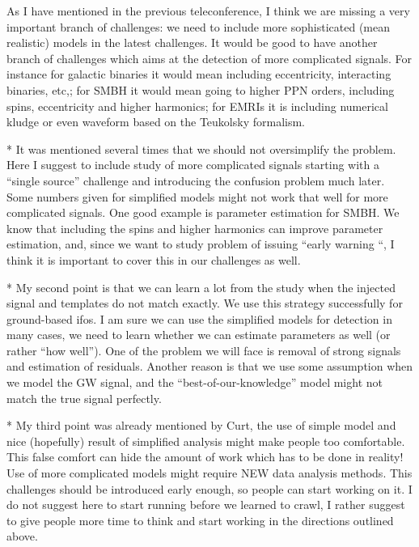 \documentclass[11pt]{report}
\begin{document}
As I have mentioned in the previous teleconference, I think we are missing a very important branch of challenges: we need to include more sophisticated (mean realistic) models in the latest challenges. It would be good to have another branch of challenges which aims at the detection of more complicated signals. For instance for galactic binaries it would mean including eccentricity, interacting binaries, etc,; for SMBH it would mean going to higher PPN orders, including spins, eccentricity and higher harmonics; for EMRIs it is including numerical kludge or even waveform based on the Teukolsky formalism.

* It was mentioned several times that we should not oversimplify the problem. Here I suggest to include study of more complicated signals starting with a “single source” challenge and introducing the confusion problem much later. Some numbers given for simplified models might not work that well for more complicated signals. One good example is parameter estimation for SMBH. We know that including the spins and higher harmonics can improve parameter estimation, and, since we want to study problem of issuing “early warning “, I think it is important to cover this in our challenges as well.

* My second point is that we can learn a lot from the study when the injected signal and templates do not match exactly. We use this strategy successfully for ground-based ifos. I am sure we can use the simplified models for detection in many cases, we need to learn whether we can estimate parameters as well (or rather “how well”). One of the problem we will face is removal of strong signals and estimation of residuals. Another reason is that we use some assumption when we model the GW signal, and the “best-of-our-knowledge” model might not match the true signal perfectly.

* My third point was already mentioned by Curt, the use of simple model and nice (hopefully) result of simplified analysis might make people too comfortable. This false comfort can hide the amount of work which has to be done in reality! Use of more complicated models might require NEW data analysis methods. This challenges should be introduced early enough, so people can start working on it. I do not suggest here to start running before we learned to crawl, I rather suggest to give people more time to think and start working in the directions outlined above.


\begin{thebibliography}{}

\end{thebibliography}
\end{document}
